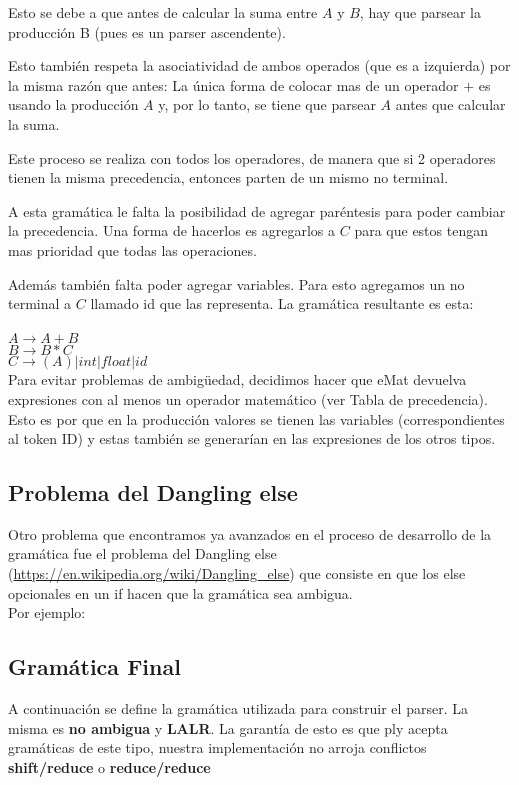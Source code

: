 Esto se debe a que antes de calcular la suma entre $A$ y $B$, hay que parsear la producción B (pues es un parser ascendente). 

Esto también respeta la asociatividad de ambos operados (que es a izquierda) por la misma razón que antes: La única forma de colocar mas de un operador $+$ es usando la producción $A$ y, por lo tanto, se tiene que parsear $A$ antes que calcular la suma.

Este proceso se realiza con todos los operadores, de manera que si 2 operadores tienen la misma precedencia, entonces parten de un mismo no terminal.

A esta gramática le falta la posibilidad de agregar paréntesis para poder cambiar la precedencia. Una forma de hacerlos es agregarlos a $C$ para que estos tengan mas prioridad que todas las operaciones.

Además también falta poder agregar variables. Para esto agregamos un no terminal a $C$ llamado id que las representa. La gramática resultante es esta:\\
\\$A \rightarrow A + B$ \\
$B \rightarrow B * C$ \\
$C \rightarrow (A) | int | float | id$ \\

Para evitar problemas de ambigüedad, decidimos hacer que eMat devuelva expresiones con al menos un operador matemático (ver Tabla de precedencia). Esto es por que en la producción valores se tienen las variables (correspondientes al token ID) y estas
también se generarían en las expresiones de los otros tipos.

\subsection{Problema del Dangling else}

Otro problema que encontramos ya avanzados en el proceso de desarrollo de la gramática fue el problema del Dangling else (\url{https://en.wikipedia.org/wiki/Dangling_else}) que consiste en que los else opcionales en un if hacen que la gramática sea ambigua. 
\\
Por ejemplo: 

\subsection{Gramática Final}
A continuación se define la gramática utilizada para construir el parser. La misma es \textbf{no ambigua} y \textbf{LALR}. La garantía de esto es que ply acepta gramáticas de este tipo, nuestra implementación no arroja conflictos \textbf{shift/reduce} o \textbf{reduce/reduce} \\

